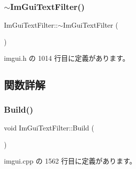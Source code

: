 \subsubsection{\texorpdfstring{$\sim$\+Im\+Gui\+Text\+Filter()}{~ImGuiTextFilter()}}
{\footnotesize\ttfamily Im\+Gui\+Text\+Filter\+::$\sim$\+Im\+Gui\+Text\+Filter (\begin{DoxyParamCaption}{ }\end{DoxyParamCaption})\hspace{0.3cm}{\ttfamily [inline]}}



 imgui.\+h の 1014 行目に定義があります。



\subsection{関数詳解}
\mbox{\label{struct_im_gui_text_filter_aef362baafaa9dfa62d11bc6101c0f4c1}} 
\subsubsection{\texorpdfstring{Build()}{Build()}}
{\footnotesize\ttfamily void Im\+Gui\+Text\+Filter\+::\+Build (\begin{DoxyParamCaption}{ }\end{DoxyParamCaption})}



 imgui.\+cpp の 1562 行目に定義があります。

